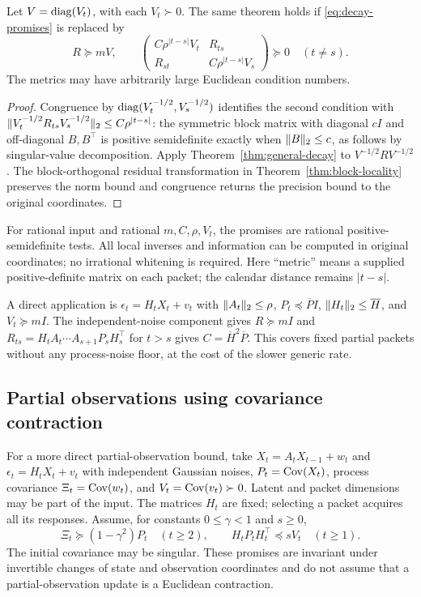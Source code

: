 \begin{corollary}
\label{cor:decay-metric}
Let $V=\operatorname{diag}(V_t)$, with each $V_t\succ0$. The same theorem holds if
\eqref{eq:decay-promises} is replaced by
\begin{equation}
 R\succeq mV,\qquad
 \begin{pmatrix}
 C\rho^{|t-s|}V_t&R_{ts}\\R_{st}&C\rho^{|t-s|}V_s
 \end{pmatrix}\succeq0\quad(t\ne s).
 \label{eq:metric-decay-promises}
\end{equation}
The metrics may have arbitrarily large Euclidean condition numbers.
\end{corollary}
\begin{proof}
Congruence by $\operatorname{diag}(V_t^{-1/2},V_s^{-1/2})$ identifies the second
condition with
$\lVert V_t^{-1/2}R_{ts}V_s^{-1/2}\rVert_2\le C\rho^{|t-s|}$:
the symmetric block matrix with diagonal $cI$ and off-diagonal $B,B^\top$
is positive semidefinite exactly when $\lVert B\rVert_2\le c$, as follows by
singular-value decomposition. Apply Theorem~\ref{thm:general-decay}
to $V^{-1/2}RV^{-1/2}$. The block-orthogonal residual transformation in
Theorem~\ref{thm:block-locality} preserves the norm bound and congruence
returns the precision bound to the original coordinates.
\end{proof}
For rational input and rational $m,C,\rho,V_t$, the promises are rational
positive-semidefinite tests. All local inverses and information can be
computed in original coordinates; no irrational whitening is required.
Here ``metric'' means a supplied positive-definite matrix on each packet;
the calendar distance remains $|t-s|$.

A direct application is $\epsilon_t=H_tX_t+v_t$ with
$\lVert A_t\rVert_2\le\rho$, $P_t\preceq\overline P I$,
$\lVert H_t\rVert_2\le\overline H$, and $V_t\succeq mI$.
The independent-noise component gives $R\succeq mI$ and
$R_{ts}=H_tA_t\cdots A_{s+1}P_sH_s^\top$ for $t>s$ gives
$C=\overline H^2\overline P$. This covers fixed partial packets without
any process-noise floor, at the cost of the slower generic rate.

\subsection{Partial observations using covariance contraction}
\label{subsec:partial-locality}
For a more direct partial-observation bound, take
$X_t=A_tX_{t-1}+w_t$ and $\epsilon_t=H_tX_t+v_t$ with independent
Gaussian noises, $P_t=\operatorname{Cov}(X_t)$, process covariance $\Xi_t=\operatorname{Cov}(w_t)$,
and $V_t=\operatorname{Cov}(v_t)\succ0$. Latent and packet dimensions may be part of
the input. The matrices $H_t$ are fixed; selecting a packet acquires all
its responses. Assume, for constants $0\le\gamma<1$ and $s\ge0$,
\begin{equation}
 \Xi_t\succeq(1-\gamma^2)P_t\quad(t\ge2),\qquad
 H_tP_tH_t^\top\preceq sV_t\quad(t\ge1).
 \label{eq:intrinsic-partial-promises}
\end{equation}
The initial covariance may be singular. These promises are invariant under
invertible changes of state and observation coordinates and do not assume
that a partial-observation update is a Euclidean contraction.

